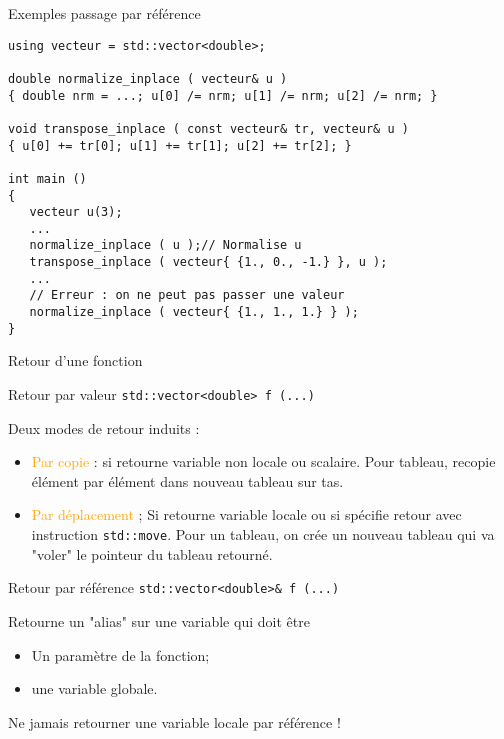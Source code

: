\documentclass[handout,10pt]{beamer}
\begin{document}
\begin{frame}[fragile]{Exemples passage par référence}
\tiny
\begin{lstlisting}
using vecteur = std::vector<double>;

double normalize_inplace ( vecteur& u )
{ double nrm = ...; u[0] /= nrm; u[1] /= nrm; u[2] /= nrm; }

void transpose_inplace ( const vecteur& tr, vecteur& u )
{ u[0] += tr[0]; u[1] += tr[1]; u[2] += tr[2]; }

int main ()
{
   vecteur u(3);
   ...
   normalize_inplace ( u );// Normalise u
   transpose_inplace ( vecteur{ {1., 0., -1.} }, u );
   ...
   // Erreur : on ne peut pas passer une valeur
   normalize_inplace ( vecteur{ {1., 1., 1.} } );
}
\end{lstlisting}
\end{frame}

\begin{frame}[fragile]{Retour d'une fonction}
\tiny
\begin{block}{Retour par valeur}
\lstinline{std::vector<double> f (...)}

Deux modes de retour induits : 
\begin{itemize}
\item {\textcolor{orange}{Par copie}} : si retourne variable non locale ou scalaire. Pour tableau, recopie élément par élément dans nouveau tableau sur tas.
\item {\textcolor{orange}{Par déplacement}} ; Si retourne variable locale ou si spécifie retour avec instruction \lstinline$std::move$. Pour un tableau, on crée un nouveau tableau qui va "voler" le pointeur du tableau retourné.
\end{itemize}
\end{block}

\begin{block}{Retour par référence}
\lstinline{std::vector<double>& f (...)}

Retourne un "alias" sur une variable qui doit être 
\begin{itemize}
\item Un paramètre de la fonction;
\item une variable globale.
\end{itemize}
\alert{Ne jamais retourner une variable locale par référence !}
\end{block}
\end{frame}
\end{document}
